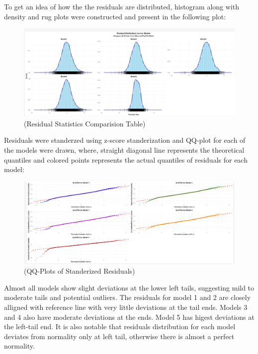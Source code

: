 \documentclass[12pt,a4paper]{article}
\begin{document}
To get an idea of how the the residuals are distributed,  
histogram along with density and rug plots were constructed and present in the 
following plot: 

\begin{figure}[H]
  \centering
  \includegraphics[width=\textwidth]{y8.png}
  \caption{(Residual Statistics Comparision Table)}
  \label{fig:Comparision Table}
\end{figure}

Residuals were standerzed using z-score standerization and QQ-plot for each of the
models were drawn, where, straight diagonal line represents the theoretical quantiles 
and colored points represents the actual quantiles of residuals for each model:

\begin{figure}[H]
  \centering
  \includegraphics[width=\textwidth]{y9.png}
  \caption{(QQ-Plots of Standerized Residuals)}
  \label{fig:Comparision of Residuals Normality}
\end{figure}


Almost all models show slight deviations at 
the lower left tails, suggesting mild to moderate tails and potential outliers. 
The residuals for model 1 and 2 are closely alligned with reference line with very little deviations
at the tail ends. Models 3 and 4 also have moderate deviations at the ends.
Model 5 has higest deviations at the left-tail end. It is also notable that residuals distribution for 
each model deviates from normality only at left tail, otherwise there is almost a perfect 
normality.
\end{document}
